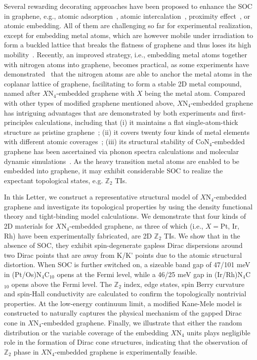 \documentclass[aps,prl,twocolumn,showpacs,superscriptaddress]{revtex4-1}
\begin{document}
Several rewarding decorating approaches have been proposed to enhance the SOC in graphene, e.g., atomic adsorption~\cite {ref9, ref10, ref11}, atomic intercalation~\cite {ref40,ref41}, proximity effect~\cite {ref49}, or atomic embedding. All of them are challenging so far for experimental realization, except for embedding metal atoms, which are however mobile under irradiation to form a buckled lattice that breaks the flatness of graphene and thus loses its high mobility~\cite {ref59,ref60}. Recently, an improved strategy, i.e., embedding metal atoms together with nitrogen atoms into graphene, becomes practical, as some experiments have demonstrated~\cite {ref18,ref19,ref21} that the nitrogen atoms are able to anchor the metal atoms in the coplanar lattice of graphene, facilitating to form a stable 2D metal compound, named after $X$N$_4$-embedded graphene with $X$ being the metal atom. Compared with other types of modified graphene mentioned above, $X$N$_4$-embedded graphene has intriguing advantages that are demonstrated by both experiments and first-principles calculations, including that (i) it maintains a flat single-atom-thick structure as pristine graphene~\cite {ref18,ref19,ref21}; (ii) it covers twenty four kinds of metal elements with different atomic coverages~\cite{ref20}; (iii) its structural stability of CoN$_4$-embedded graphene has been ascertained via phonon spectra calculations and molecular dynamic simulations~\cite {ref12}. As the heavy transition metal atoms are enabled to be embedded into graphene, it may exhibit considerable SOC to realize the expectant topological states, e.g. $\mathbb{Z}_2$ TIs.

In this Letter, we construct a representative structural model of $X$N$_4$-embedded graphene and investigate its topological properties by using the density functional theory and tight-binding model calculations. We demonstrate that four kinds of 2D materials for $X$N$_4$-embedded graphene, as three of which (i.e., $X=$Pt, Ir, Rh) have been experimentally fabricated, are 2D $\mathbb{Z}_2$ TIs. We show that in the absence of SOC, they exhibit spin-degenerate gapless Dirac dispersions around two Dirac points that are away from K/K' points due to the atomic structural distortion. When SOC is further switched on, a sizeable band gap of 47/101 meV in (Pt/Os)N$_4$C$_{10}$ opens at the Fermi level, while a 46/25 meV gap in (Ir/Rh)N$_4$C$_{10}$ opens above the Fermi level. The $\mathbb{Z}_2$ index, edge states, spin Berry curvature and spin-Hall conductivity are calculated to confirm the topologically nontrivial properties. At the low-energy continuum limit, a modified Kane-Mele model is constructed to naturally captures the physical mechanism of the gapped Dirac cone in $X$N$_4$-embedded graphene. Finally, we illustrate that either the random distribution or the variable coverage of the embedding $X$N$_4$ units plays negligible role in the formation of Dirac cone structures, indicating that the observation of $\mathbb{Z}_2$ phase in $X$N$_4$-embedded graphene is experimentally feasible.
\end{document}
